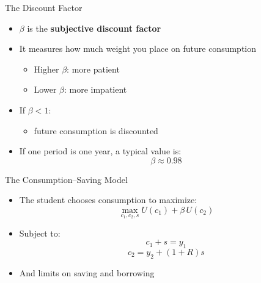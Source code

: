 \documentclass[10pt,aspectratio=169]{beamer}
\begin{document}
\begin{frame}{The Discount Factor}

\begin{itemize}
    \item \( \beta \) is the \textbf{subjective discount factor}
    \vspace{0.3cm}

    \item It measures how much weight you place on future consumption
    \vspace{0.3cm}
    \begin{itemize}
        \item Higher \( \beta \): more patient
        \item Lower \( \beta \): more impatient
    \end{itemize}
    \vspace{0.3cm}

    \item If \( \beta < 1 \):
    \begin{itemize}
        \item future consumption is discounted
    \end{itemize}
    \vspace{0.3cm}

    \item If one period is one year, a typical value is:
    \[
    \beta \approx 0.98
    \]
\end{itemize}

\end{frame}

\begin{frame}{The Consumption--Saving Model}

\begin{itemize}
    \item The student chooses consumption to maximize:
    \[
    \max_{c_1, c_2,s}U(c_1) + \beta\, U(c_2)
    \]
    \vspace{-0.3cm}

    \item Subject to:
    \[
    c_1 + s = y_1
    \]
    \[
    c_2 = y_2 + (1+R)s
    \]
    \vspace{-0.2cm}

    \item And limits on saving and borrowing
\end{itemize}

\end{frame}
\end{document}
